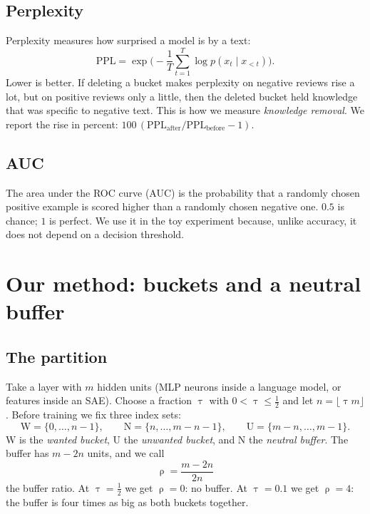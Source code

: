 \documentclass[11pt,a4paper]{article}
\theoremstyle{definition}
\newcommand{\Wb}{\mathrm{W}}
\newcommand{\Nb}{\mathrm{N}}
\newcommand{\Ub}{\mathrm{U}}
\begin{document}
\subsection{Perplexity}
Perplexity measures how surprised a model is by a text:
\begin{equation}
  \mathrm{PPL}=\exp\!\Big(-\frac1T\sum_{t=1}^{T}\log p(x_t\mid x_{<t})\Big).
\end{equation}
Lower is better. If deleting a bucket makes perplexity on negative reviews rise a lot, but on
positive reviews only a little, then the deleted bucket held knowledge that was specific to
negative text. This is how we measure \emph{knowledge removal}. We report the rise in percent:
$100\,(\mathrm{PPL}_{\text{after}}/\mathrm{PPL}_{\text{before}}-1)$.

\subsection{AUC}
The area under the ROC curve (AUC) is the probability that a randomly chosen positive example is
scored higher than a randomly chosen negative one. $0.5$ is chance; $1$ is perfect. We use it in
the toy experiment because, unlike accuracy, it does not depend on a decision threshold.

\section{Our method: buckets and a neutral buffer}
\label{sec:method}

\subsection{The partition}
Take a layer with $m$ hidden units (MLP neurons inside a language model, or features inside an
SAE). Choose a fraction $\uptau$ with $0<\uptau\le\frac12$ and let $n=\lfloor\uptau m\rfloor$.
Before training we fix three index sets:
\begin{equation}
  \Wb=\{0,\dots,n-1\},\qquad
  \Nb=\{n,\dots,m-n-1\},\qquad
  \Ub=\{m-n,\dots,m-1\}.
\end{equation}
$\Wb$ is the \emph{wanted bucket}, $\Ub$ the \emph{unwanted bucket}, and $\Nb$ the
\emph{neutral buffer}. The buffer has $m-2n$ units, and we call
\begin{equation}
  \uprho=\frac{m-2n}{2n}
\end{equation}
the buffer ratio. At $\uptau=\frac12$ we get $\uprho=0$: no buffer. At $\uptau=0.1$ we get
$\uprho=4$: the buffer is four times as big as both buckets together.
\end{document}

